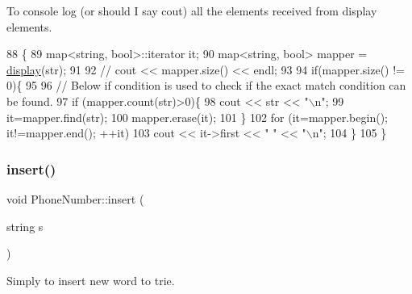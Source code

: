To console log (or should I say cout) all the elements received from display elements. 


\begin{DoxyCode}
88                                           \{
89     map<string, bool>::iterator it;
90     map<string, bool> mapper = \hyperlink{class_phone_number_a0aefa75c9d4542be0ca256c798706732}{display}(str);
91 
92     \textcolor{comment}{// cout << mapper.size() << endl;}
93 
94     \textcolor{keywordflow}{if}(mapper.size() != 0)\{
95 
96         \textcolor{comment}{// Below if condition is used to check if the exact match condition can be found.}
97         \textcolor{keywordflow}{if} (mapper.count(str)>0)\{
98             cout << str << \textcolor{stringliteral}{"\(\backslash\)n"};
99             it=mapper.find(str);
100             mapper.erase(it);
101         \}
102         \textcolor{keywordflow}{for} (it=mapper.begin(); it!=mapper.end(); ++it)
103             cout << it->first << \textcolor{stringliteral}{" "} << \textcolor{stringliteral}{"\(\backslash\)n"};
104     \}
105 \}
\end{DoxyCode}
\mbox{\label{class_phone_number_a2a9b999ad972df12db343245c95bab1b}} 
\subsubsection{\texorpdfstring{insert()}{insert()}}
{\footnotesize\ttfamily void Phone\+Number\+::insert (\begin{DoxyParamCaption}\item[{string}]{s }\end{DoxyParamCaption})}



Simply to insert new word to trie. 


